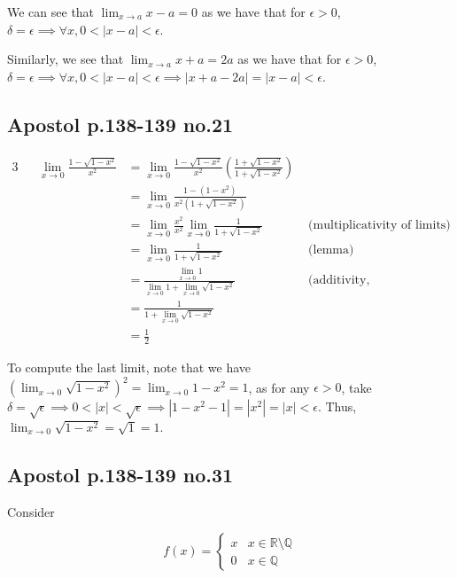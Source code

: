 \documentclass[12pt,letterpaper]{article}
\theoremstyle{definition}
\newcommand{\R}{\mathbb{R}}
\newcommand{\Q}{\mathbb{Q}}
\begin{document}
We can see that $\lim_{x \rightarrow a} x - a = 0$ as we have that for $\epsilon
> 0$, $\delta = \epsilon \implies \forall x, 0 < |x - a| < \epsilon$.

Similarly, we see that $\lim_{x \rightarrow a} x + a = 2a$ as we have that for
$\epsilon > 0$, $\delta = \epsilon \implies \forall x, 0 < |x - a| < \epsilon
\implies |x + a - 2a| = |x - a| < \epsilon$. 

\subsection*{Apostol p.138-139 no.21}

\begin{alignat*}{3}
  && \lim_{x\rightarrow 0} \frac{1 - \sqrt{1-x^2}}{x^2} &= \lim_{x\rightarrow 0}
  \frac{1 - \sqrt{1-x^2}}{x^2}(\frac{1 + \sqrt{1-x^2}}{1 + \sqrt{1-x^2}}) &\\
  && &= \lim_{x\rightarrow 0} \frac{1 - (1 - x^2)}{x^2(1 +\sqrt{1-x^2})} &\\
  && &= \lim_{x\rightarrow 0} \frac{x^2}{x^2}\lim_{x\rightarrow 0}\frac{1}{1
    +\sqrt{1-x^2}} & \text{ (multiplicativity of limits) }\\
  && &= \lim_{x\rightarrow 0}\frac{1}{1 + \sqrt{1 -x^2}} & \text{ (lemma) }\\
  && &= \frac{\lim_{x\rightarrow 0} 1}{\lim_{x\rightarrow 0} 1 +
    \lim_{x\rightarrow 0} \sqrt{1 - x^2}} & \text{ (additivity, multiplicativity
    of limits) } \\
  && &= \frac{1}{1 + \lim_{x\rightarrow 0} \sqrt{1 - x^2}} &\\
  && &= \frac{1}{2}
\end{alignat*}

To compute the last limit, note that we have $(\lim_{x\rightarrow 0}
\sqrt{1-x^2})^2 = \lim_{x\rightarrow 0} 1-x^2 = 1$, as for any $\epsilon > 0$,
take $\delta = \sqrt{\epsilon} \implies 0 < |x| < \sqrt{\epsilon} \implies |1 -
x^2 - 1| = |x^2| = |x| < \epsilon$. Thus, $\lim_{x\rightarrow 0} \sqrt{1-x^2} =
\sqrt{1} = 1$.

\subsection*{Apostol p.138-139 no.31}

Consider

\[
  f(x) = \begin{cases}
    x & x \in \R \setminus \Q \\
    0 & x \in \Q
  \end{cases}
\]
\end{document}
